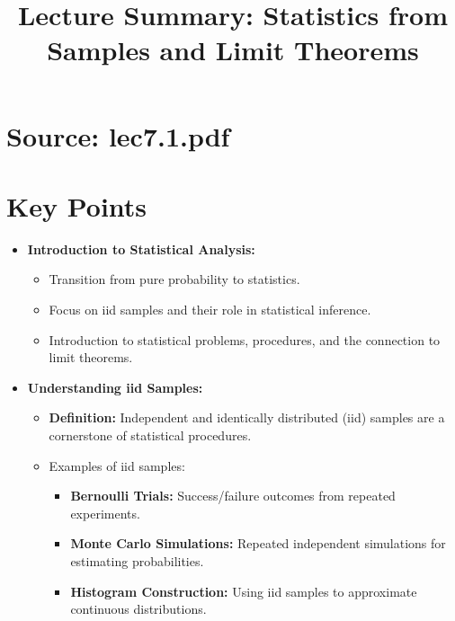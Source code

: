 \documentclass{article}
\title{Lecture Summary: Statistics from Samples and Limit Theorems}
\author{}
\date{}
\begin{document}
\maketitle

\section*{Source: lec7.1.pdf}

\section*{Key Points}

\begin{itemize}
  \item \textbf{Introduction to Statistical Analysis:}
    \begin{itemize}
      \item Transition from pure probability to statistics.
      \item Focus on iid samples and their role in statistical inference.
      \item Introduction to statistical problems, procedures, and the connection to limit theorems.
    \end{itemize}

  \item \textbf{Understanding iid Samples:}
    \begin{itemize}
      \item \textbf{Definition:} Independent and identically distributed (iid) samples are a cornerstone of statistical procedures.
      \item Examples of iid samples:
        \begin{itemize}
          \item \textbf{Bernoulli Trials:} Success/failure outcomes from repeated experiments.
          \item \textbf{Monte Carlo Simulations:} Repeated independent simulations for estimating probabilities.
          \item \textbf{Histogram Construction:} Using iid samples to approximate continuous distributions.
        \end{itemize}
    \end{itemize}


\end{itemize}
\end{document}
